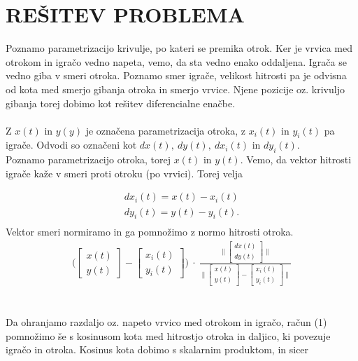 \documentclass[a4paper,12pt]{article}
\begin{document}
\newpage
\section{\textsc{\large{REŠITEV PROBLEMA}}}

Poznamo parametrizacijo krivulje, po kateri se premika otrok. Ker je vrvica med otrokom in 
igračo vedno napeta, vemo, da sta vedno enako oddaljena. Igrača se vedno giba v smeri otroka. 
Poznamo smer igrače, velikost hitrosti pa je odvisna od kota med smerjo gibanja otroka in smerjo vrvice.
Njene pozicije oz. krivuljo gibanja torej dobimo kot rešitev diferencialne enačbe.
\\
\\
Z $x(t)$ in $y(y)$ je označena parametrizacija otroka, z $x_i(t)$ in $y_i(t)$ pa igrače. Odvodi so označeni kot $dx(t), \ dy(t), \ dx_i(t)$ in $dy_i(t)$. \\
Poznamo parametrizacijo otroka, torej $x(t)$ in $y(t)$. Vemo, da vektor hitrosti igrače kaže v smeri proti otroku (po vrvici).
Torej velja

\begin{align*}
    dx_i(t) = x(t) - x_i(t) \\
    dy_i(t) = y(t) - y_i(t). \\
\end{align*}
Vektor smeri normiramo in ga pomnožimo z normo hitrosti otroka.
\\
\begin{align}
     \Big(
    \begin{bmatrix} 
        x(t) \\
        y(t)
    \end{bmatrix}
    -
    \begin{bmatrix} 
        x_i(t) \\
        y_i(t) 
    \end{bmatrix}
    \Big)
    \ \cdot \
    \frac{
    \Big \|
    \begin{bmatrix} 
        dx(t) \\
        dy(t)
    \end{bmatrix}
    \Big \|
    }
    {
    \Big \|
    \begin{bmatrix} 
        x(t) \\
        y(t)
    \end{bmatrix}
    -
    \begin{bmatrix} 
        x_i(t) \\
        y_i(t) 
    \end{bmatrix}
    \Big \|
    }
\end{align}
\\
\\
Da ohranjamo razdaljo oz. napeto vrvico med otrokom in igračo, račun (1) pomnožimo še 
s kosinusom kota med hitrostjo otroka in daljico, ki povezuje igračo in otroka. 
Kosinus kota dobimo s skalarnim produktom, in sicer
\end{document}
